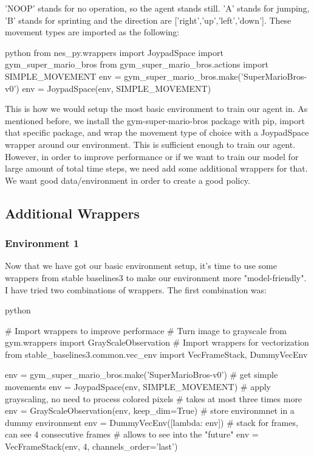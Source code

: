 \documentclass{article}
\numberwithin{equation}{section}
\numberwithin{equation}{section}
\begin{document}
'NOOP' stands for no operation, so the agent stands still. 'A' stands for jumping, 'B' stands for sprinting and the direction are ['right','up','left','down']. These movement types are imported as the following:
\begin{mintedbox}{python}
from nes_py.wrappers import JoypadSpace
import gym_super_mario_bros
from gym_super_mario_bros.actions import SIMPLE_MOVEMENT
env = gym_super_mario_bros.make('SuperMarioBros-v0')
env = JoypadSpace(env, SIMPLE_MOVEMENT)
\end{mintedbox}

This is how we would setup the most basic environment to train our agent in. As mentioned before, we install the gym-super-mario-bros package with pip, import that specific package, and wrap the movement type of choice with a JoypadSpace wrapper around our environment. This is sufficient enough to train our agent. However, in order to improve performance or if we want to train our model for large amount of total time steps, we need add some additional wrappers for that. We want good data/environment in order to create a good policy.


\subsection*{Additional Wrappers}
\subsubsection*{Environment 1}
Now that we have got our basic environment setup, it's time to use some wrappers from stable baselines3 to make our environment more "model-friendly". I have tried two combinations of wrappers. The first combination was:

\begin{mintedbox}{python}

# Import wrappers to improve performace
# Turn image to grayscale
from gym.wrappers import GrayScaleObservation
# Import wrappers for vectorization
from stable_baselines3.common.vec_env import VecFrameStack, DummyVecEnv

env = gym_super_mario_bros.make('SuperMarioBros-v0')
# get simple movements
env = JoypadSpace(env, SIMPLE_MOVEMENT)
# apply grayscaling, no need to process colored pixels
# takes at most three times more
env = GrayScaleObservation(env, keep_dim=True)
# store environmnet in a dummy environment
env = DummyVecEnv([lambda: env])
# stack for frames, can see 4 consecutive frames
# allows to see into the "future"
env = VecFrameStack(env, 4, channels_order='last')
\end{mintedbox}
\end{document}

